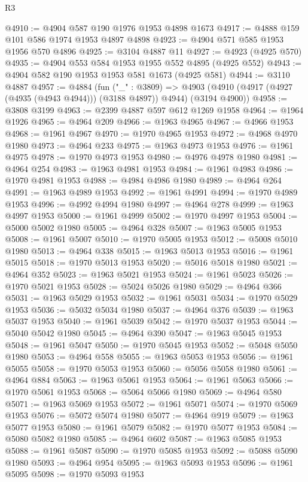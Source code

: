 \begin{lexlean}{R3}
\begin{coremodule}
@4910 := @4904 @587 @190 @1976 @1953 @4898 @1673
@4917 := @4888 @159 @101 @586 @1974 @1953 @4897 @4898
@4923 := @4904 @571 @585 @1953 @1956 @570 @4896
@4925 := @3104 @4887 @11
@4927 := @4923 (@4925 @570)
@4935 := @4904 @553 @584 @1953 @1955 @552 @4895 (@4925 @552)
@4943 := @4904 @582 @190 @1953 @1953 @581 @1673 (@4925 @581)
@4944 := @3110 @4887
@4957 := @4884
    (fun ("_" : @3809) =>
    @4903 (@4910 (@4917 (@4927 (@4935 (@4943 @4944))) (@3188 @4897)) @4944) (@3194 @4900))
@4958 := @3808 @3199
@4963 := @2399 @4887 @597 @612 @1269 @1958
@4964 := @1964 @1926
@4965 := @4964 @209
@4966 := @1963 @4965
@4967 := @4966 @1953
@4968 := @1961 @4967
@4970 := @1970 @4965 @1953
@4972 := @4968 @4970 @1980
@4973 := @4964 @233
@4975 := @1963 @4973 @1953
@4976 := @1961 @4975
@4978 := @1970 @4973 @1953
@4980 := @4976 @4978 @1980
@4981 := @4964 @254
@4983 := @1963 @4981 @1953
@4984 := @1961 @4983
@4986 := @1970 @4981 @1953
@4988 := @4984 @4986 @1980
@4989 := @4964 @264
@4991 := @1963 @4989 @1953
@4992 := @1961 @4991
@4994 := @1970 @4989 @1953
@4996 := @4992 @4994 @1980
@4997 := @4964 @278
@4999 := @1963 @4997 @1953
@5000 := @1961 @4999
@5002 := @1970 @4997 @1953
@5004 := @5000 @5002 @1980
@5005 := @4964 @328
@5007 := @1963 @5005 @1953
@5008 := @1961 @5007
@5010 := @1970 @5005 @1953
@5012 := @5008 @5010 @1980
@5013 := @4964 @338
@5015 := @1963 @5013 @1953
@5016 := @1961 @5015
@5018 := @1970 @5013 @1953
@5020 := @5016 @5018 @1980
@5021 := @4964 @352
@5023 := @1963 @5021 @1953
@5024 := @1961 @5023
@5026 := @1970 @5021 @1953
@5028 := @5024 @5026 @1980
@5029 := @4964 @366
@5031 := @1963 @5029 @1953
@5032 := @1961 @5031
@5034 := @1970 @5029 @1953
@5036 := @5032 @5034 @1980
@5037 := @4964 @376
@5039 := @1963 @5037 @1953
@5040 := @1961 @5039
@5042 := @1970 @5037 @1953
@5044 := @5040 @5042 @1980
@5045 := @4964 @390
@5047 := @1963 @5045 @1953
@5048 := @1961 @5047
@5050 := @1970 @5045 @1953
@5052 := @5048 @5050 @1980
@5053 := @4964 @558
@5055 := @1963 @5053 @1953
@5056 := @1961 @5055
@5058 := @1970 @5053 @1953
@5060 := @5056 @5058 @1980
@5061 := @4964 @884
@5063 := @1963 @5061 @1953
@5064 := @1961 @5063
@5066 := @1970 @5061 @1953
@5068 := @5064 @5066 @1980
@5069 := @4964 @580
@5071 := @1963 @5069 @1953
@5072 := @1961 @5071
@5074 := @1970 @5069 @1953
@5076 := @5072 @5074 @1980
@5077 := @4964 @919
@5079 := @1963 @5077 @1953
@5080 := @1961 @5079
@5082 := @1970 @5077 @1953
@5084 := @5080 @5082 @1980
@5085 := @4964 @602
@5087 := @1963 @5085 @1953
@5088 := @1961 @5087
@5090 := @1970 @5085 @1953
@5092 := @5088 @5090 @1980
@5093 := @4964 @954
@5095 := @1963 @5093 @1953
@5096 := @1961 @5095
@5098 := @1970 @5093 @1953

\end{coremodule}
\end{lexlean}
